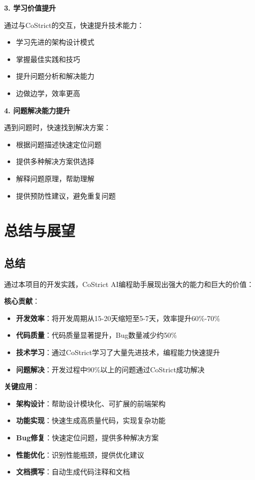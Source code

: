 \documentclass[12pt,a4paper]{article}
\begin{document}
\begin{itemize}
\textbf{3. 学习价值提升}

通过与CoStrict的交互，快速提升技术能力：

\begin{itemize}
    \item 学习先进的架构设计模式
    \item 掌握最佳实践和技巧
    \item 提升问题分析和解决能力
    \item 边做边学，效率更高
\end{itemize}

\textbf{4. 问题解决能力提升}

遇到问题时，快速找到解决方案：

\begin{itemize}
    \item 根据问题描述快速定位问题
    \item 提供多种解决方案供选择
    \item 解释问题原理，帮助理解
    \item 提供预防性建议，避免重复问题
\end{itemize}

\section{总结与展望}

\subsection{总结}

通过本项目的开发实践，CoStrict AI编程助手展现出强大的能力和巨大的价值：

\textbf{核心贡献}：
\begin{itemize}
    \item \textbf{开发效率}：将开发周期从15-20天缩短至5-7天，效率提升60\%-70\%
    \item \textbf{代码质量}：代码质量显著提升，Bug数量减少约50\%
    \item \textbf{技术学习}：通过CoStrict学习了大量先进技术，编程能力快速提升
    \item \textbf{问题解决}：开发过程中90\%以上的问题通过CoStrict成功解决
\end{itemize}

\textbf{关键应用}：
\begin{itemize}
    \item \textbf{架构设计}：帮助设计模块化、可扩展的前端架构
    \item \textbf{功能实现}：快速生成高质量代码，实现复杂功能
    \item \textbf{Bug修复}：快速定位问题，提供多种解决方案
    \item \textbf{性能优化}：识别性能瓶颈，提供优化建议
    \item \textbf{文档撰写}：自动生成代码注释和文档
\end{itemize}


\end{itemize}
\end{document}
